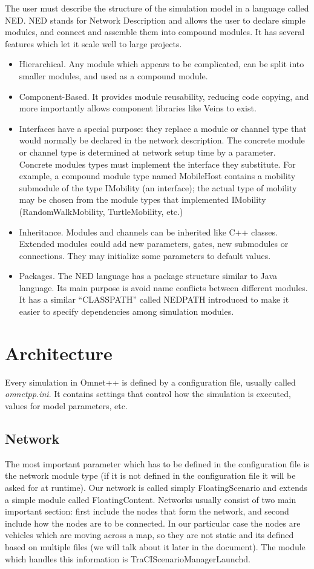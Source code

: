 The user must describe the structure of the simulation model in a language
called NED. NED stands for Network Description and allows the user to declare
simple modules, and connect and assemble them into compound modules. It has
several features which let it scale well to large projects.

\begin{itemize}
  \item Hierarchical. Any module which appears to be complicated, can be
  split into smaller modules, and used as a compound module.
  \item Component-Based. It provides module reusability, reducing code
  copying, and more importantly allows component libraries like Veins to exist.
  \item Interfaces have a special purpose: they replace a module or channel type
  that would normally be declared in the network description. The concrete
  module or channel type is determined at network setup time by a parameter.
  Concrete modules types must implement the interface they substitute. For
  example, a compound module type named MobileHost contains a mobility submodule
  of the type IMobility (an interface); the actual type of mobility may be
  chosen from the module types that implemented IMobility (RandomWalkMobility,
  TurtleMobility, etc.)
  \item Inheritance. Modules and channels can be inherited like C++ classes.
  Extended modules could add new parameters, gates, new submodules
  or connections. They may initialize some parameters to default values.
  \item Packages. The NED language has a package structure similar to Java
  language. Its main purpose is avoid name conflicts between different modules.
  It has a similar ``CLASSPATH'' called NEDPATH introduced to make it easier to
  specify dependencies among simulation modules.
\end{itemize}

\section{Architecture}
Every simulation in Omnet++ is defined by a configuration file, usually called
\mbox{\it omnetpp.ini}. It contains settings that control how the simulation is
executed, values for model parameters, etc.

\subsection{Network}
The most important parameter which has to be defined in the configuration file
is the network module type (if it is not defined in the configuration file it
will be asked for at runtime). Our network is called simply FloatingScenario and
extends a simple module called FloatingContent. Networks usually consist
of two main important section: first include the nodes that form the network,
and second include how the nodes are to be connected. In our particular case the
nodes are vehicles which are moving across a map, so they are not static and its
defined based on multiple files (we will talk about it later in the document).
The module which handles this information is TraCIScenarioManagerLaunchd.

